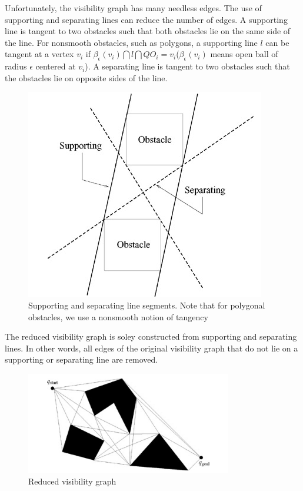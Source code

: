 \documentclass[11pt]{article}
\begin{document}
Unfortunately, the visibility graph has many needless edges. The use of supporting and separating lines can reduce the number of edges. A supporting line is tangent to two obstacles such that both obstacles lie on the same side of the line. For nonsmooth obstacles, such as polygons, a supporting line $l$ can be tangent at a vertex $v_i$ if $\beta_\epsilon(v_i) \bigcap l \bigcap QO_i = v_i $($\beta_\epsilon(v_i)$ means open ball of radius $\epsilon$ centered at $v_i$). A separating line is tangent to two obstacles such that the obstacles lie on opposite sides of the line.\\

\begin{figure}[h]
  \centering
  \includegraphics{imgs/Supporting_separating_line_segments.png}
  \caption{Supporting and separating line segments. Note that for polygonal obstacles, we use a nonsmooth notion of tangency}
\end{figure}

The reduced visibility graph is soley constructed from supporting and separating lines. In other words, all edges of the original visibility graph that do not lie on a supporting or separating line are removed. \\

\begin{figure}[h]
  \centering
  \includegraphics[width=9cm]{imgs/R_V_G.png}
  \caption{Reduced visibility graph}
\end{figure}
\end{document}

